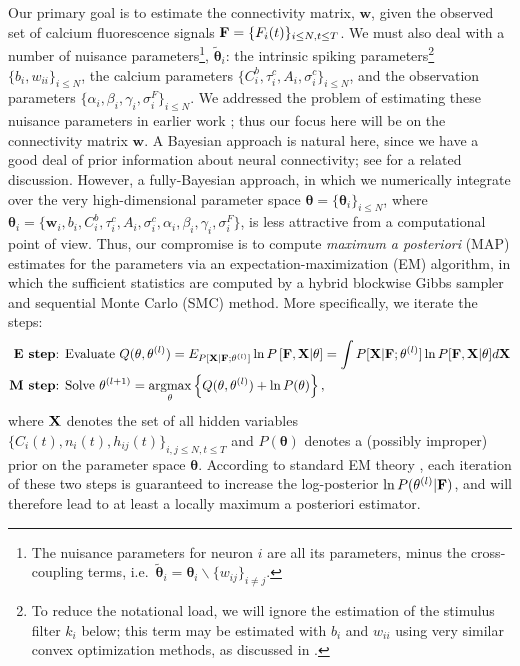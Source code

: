 \documentclass[aoas,preprint]{imsart}
\newcommand{\bth}{\mathbf{\theta}}
\newcommand{\w}{w}
\newcommand{\bw}{\mathbf{\w}}
\DeclareMathOperator*{\argmax}{argmax}
\newcommand{\bF}{{\bf F}}
\newcommand{\bX}{{\bf X}}
\newcommand{\tbth}{\tilde{\bth}}
\begin{document}
Our primary goal is to estimate the connectivity matrix, $\bw$, given
the observed set of calcium fluorescence signals $\bF=\{F_i(t)\}_{i
\leq N, t\leq T}$. We must also deal with a number of nuisance
parameters\footnote{The nuisance parameters for neuron $i$ are all its
parameters, minus the cross-coupling terms, i.e.\ $\tbth_i =\bth_i
\backslash \{w_{ij}\}_{i\neq j}$.}, $\tbth_i$: the intrinsic spiking
parameters\footnote{To reduce the notational load, we will ignore the
estimation of the stimulus filter $k_i$ below; this term may be
estimated with $b_i$ and $w_{ii}$ using very similar convex
optimization methods, as discussed in \cite{Vogelstein2009}.}  $\{b_i,
w_{ii}\}_{i\leq N}$, the calcium parameters $\{C^b_i, \tau^c_i, A_i,
\sigma^c_i\}_{i\leq N}$, and the observation parameters $\{\alpha_i,
\beta_i, \gamma_i, \sigma^F_i\}_{i\leq N}$. We addressed the problem
of estimating these nuisance parameters in earlier work
\cite{Vogelstein2009}; thus our focus here will be on the connectivity
matrix $\bw$. A Bayesian approach is natural here, since we have a
good deal of prior information about neural connectivity; see
\cite{Rigat06} for a related discussion. However, a fully-Bayesian
approach, in which we numerically integrate over the very
high-dimensional parameter space $\bth= \{\bth_i\}_{i\leq N}$, where
$\bth_i=\{\bw_i, b_i, C^b_i, \tau^c_i, A_i, \sigma^c_i, \alpha_i,
\beta_i, \gamma_i, \sigma^F_i\}$, is less attractive from a
computational point of view. Thus, our compromise is to compute
\emph{maximum a posteriori} (MAP) estimates for the parameters via an
expectation-maximization (EM) algorithm, in which the sufficient
statistics are computed by a hybrid blockwise Gibbs sampler and
sequential Monte Carlo (SMC) method. More specifically, we iterate the
steps:
\begin{align*}
\textbf{E step} &\text{: Evaluate } Q(\bth,\bth^{(l)}) = E_{P[\bX |
\bF; \bth^{(l)}]} \ln P \left[ \bF, \bX | \bth \right] = \int P[\bX |
\bF; \bth^{(l)}] \ln P[\bF, \bX | \bth] d \bX \\ \textbf{M step}
&\text{: Solve } \bth^{(l+1)} = \argmax_{\bth} \left\{
Q(\bth,\bth^{(l)}) + \ln P(\bth) \right\},
\end{align*}
where $\bX$ denotes the set of all hidden variables $\{ C_i(t), n_i(t), h_{ij}(t) \}_{i,j \leq N, t \leq T}$ and $P(\bth)$ denotes a (possibly improper) prior on the parameter space $\bth$. According to standard EM theory \cite{DLR77,McLachlanKrishnan96}, each iteration of these two steps is guaranteed to increase the log-posterior $\ln P(\bth^{(l)} | \bF)$, and will therefore lead to at least a locally maximum a posteriori estimator.
\end{document}
